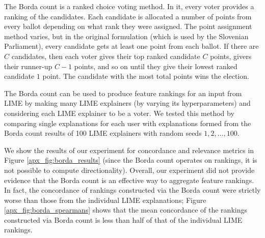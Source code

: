 \documentclass[mnsc,blindrev]{informs3}
\begin{document}
            The Borda count is a ranked choice voting method. In it, every voter provides a ranking of the candidates. Each candidate is allocated a number of points from every ballot depending on what rank they were assigned. The point assignment method varies, but in the original formulation (which is used by the Slovenian Parliament), every candidate gets at least one point from each ballot. If there are $C$ candidates, then each voter gives their top ranked candidate $C$ points, givers their runner-up $C-1$ points, and so on until they give their lowest ranked candidate $1$ point. The candidate with the most total points wins the election.

            The Borda count can be used to produce feature rankings for an input from LIME by making many LIME explainers (by varying its hyperparameters) and considering each LIME explainer to be a voter. We tested this method by comparing single explanations for each user with explanations formed from the Borda count results of 100 LIME explainers with random seeds $1,2,\ldots,100$.
            
             We show the results of our experiment for concordance and relevance metrics in Figure \ref{apx_fig:borda_results} (since the Borda count operates on rankings, it is not possible to compute directionality). Overall, our experiment did not provide evidence that the Borda count is an effective way to aggregate feature rankings. In fact, the concordance of rankings constructed via the Borda count were strictly worse than those from the individual LIME explanations; Figure \ref{apx_fig:borda_spearmans} shows that the mean concordance of the rankings constructed via Borda count is less than half of that of the individual LIME rankings.
\end{document}
